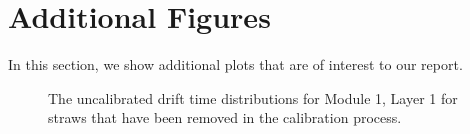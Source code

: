 \documentclass[a4paper]{report}
\numberwithin{equation}{section}
\begin{document}
\printbibliography

\appendix 

\chapter{Additional Figures} \label{chap:appendix}


In this section, we show additional plots that are of interest to our report.\par 

\begin{figure}[htb!]
	\centering
	\quad
	\centering
	\quad
	\centering
	\quad
	\centering
	\caption{The uncalibrated drift time distributions for Module 1, Layer 1 for straws that have been removed 
	in the calibration process.}
	\label{fig:calib_drift_straws}
\end{figure}
\end{document}
